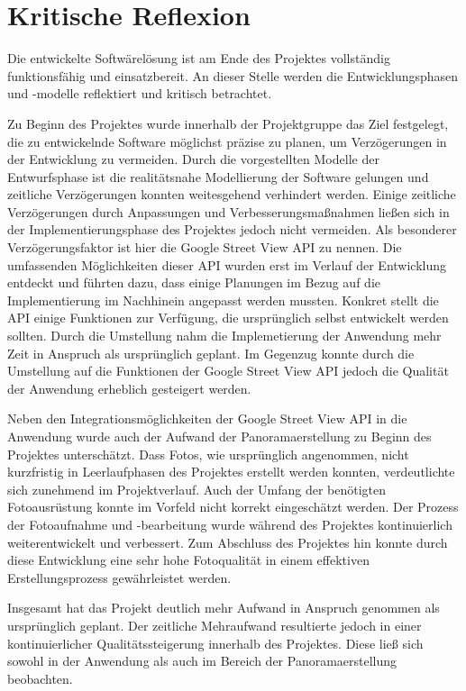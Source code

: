 \section{Kritische Reflexion}
\label{sec:KritischeReflexion}

Die entwickelte Softwärelösung ist am Ende des Projektes vollständig
funktionsfähig und einsatzbereit. An dieser Stelle werden die Entwicklungsphasen
und -modelle reflektiert und kritisch betrachtet.

Zu Beginn des Projektes wurde innerhalb der Projektgruppe das Ziel festgelegt,
die zu entwickelnde Software möglichst präzise zu planen, um Verzögerungen in
der Entwicklung zu vermeiden. Durch die vorgestellten Modelle der Entwurfsphase
ist die realitätsnahe Modellierung der Software gelungen und zeitliche
Verzögerungen konnten weitesgehend verhindert werden. Einige zeitliche
Verzögerungen durch Anpassungen und Verbesserungsmaßnahmen ließen sich in der
Implementierungsphase des Projektes jedoch nicht vermeiden. Als besonderer
Verzögerungsfaktor ist hier die Google Street View API zu nennen. Die
umfassenden Möglichkeiten dieser API wurden erst im Verlauf der Entwicklung
entdeckt und führten dazu, dass einige Planungen im Bezug auf die
Implementierung im Nachhinein angepasst werden mussten. Konkret stellt die
API einige Funktionen zur Verfügung, die ursprünglich selbst entwickelt werden
sollten. Durch die Umstellung nahm die Implemetierung der Anwendung mehr Zeit in
Anspruch als ursprünglich geplant. Im Gegenzug konnte durch die Umstellung auf
die Funktionen der Google Street View API jedoch die Qualität der Anwendung
erheblich gesteigert werden.

Neben den Integrationsmöglichkeiten der Google Street View API in die Anwendung
wurde auch der Aufwand der Panoramaerstellung zu Beginn des
Projektes unterschätzt. Dass Fotos, wie ursprünglich angenommen, nicht
kurzfristig in Leerlaufphasen des Projektes erstellt werden konnten,
verdeutlichte sich zunehmend im Projektverlauf. Auch der Umfang der benötigten
Fotoausrüstung konnte im Vorfeld nicht korrekt eingeschätzt werden.
Der Prozess der Fotoaufnahme und -bearbeitung wurde während des Projektes
kontinuierlich weiterentwickelt und verbessert. Zum Abschluss des Projektes hin
konnte durch diese Entwicklung eine sehr hohe Fotoqualität in einem
effektiven Erstellungsprozess gewährleistet werden.

Insgesamt hat das Projekt deutlich mehr Aufwand in Anspruch genommen als
ursprünglich geplant. Der zeitliche Mehraufwand resultierte jedoch in einer
kontinuierlicher Qualitätssteigerung innerhalb des Projektes. Diese ließ
sich sowohl in der Anwendung als auch im Bereich der Panoramaerstellung
beobachten.
